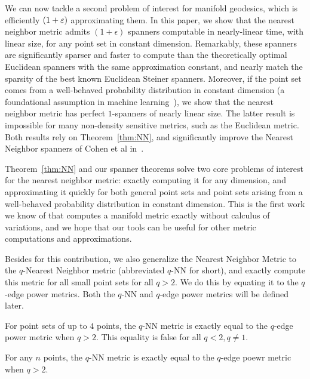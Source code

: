 We can now tackle a second problem of interest for manifold geodesics,
which is efficiently $(1+\varepsilon)$ approximating them. In this paper, we show
that the nearest neighbor metric admits $(1+\epsilon)$ spanners computable
in nearly-linear time, with linear size, for any point set in constant
dimension. Remarkably, these spanners are significantly sparser and faster
to compute than the theoretically optimal Euclidean spanners with the same
approximation constant, and nearly match the sparsity of the best known
Euclidean Steiner spanners. Moreover, if the point set comes from a
well-behaved probability distribution in constant dimension (a foundational
assumption in machine learning~\cite{}), we show that the nearest neighbor
metric has perfect $1$-spanners of nearly linear size. The latter result is
impossible for many non-density sensitive metrics, such as the Euclidean
metric. Both results rely on Theorem~\ref{thm:NN}, and significantly
improve the Nearest Neighbor spanners of Cohen et al in~\cite{}.

Theorem~\ref{thm:NN} and our spanner theorems solve two core problems of
interest for the nearest neighbor metric: exactly computing it for any
dimension, and approximating it quickly for both general point sets and
point sets arising from a well-behaved probability distribution in constant
dimension. This is the first work we know of that computes a manifold
metric exactly without calculus of variations, and we hope that our tools
can be useful for other metric computations and approximations. 

Besides for this contribution, we also generalize the Nearest Neighbor
Metric to the $q$-Nearest Neighbor metric (abbreviated $q$-NN for short),
and exactly compute this metric for all small point sets for all $q>2$. We
do this by equating it to the $q$-edge power metrics. Both the $q$-NN and
$q$-edge power metrics will be defined later.
\begin{theorem} \label{thm:qNN}
For point sets of up to $4$ points, the $q$-NN metric is exactly equal to
the $q$-edge power metric when $q>2$. This equality is false for all $q <
2, q\not=1$.
\end{theorem}
\begin{conjecture}\label{conj:qNN}
For any $n$ points, the $q$-NN metric is exactly equal to the $q$-edge
poewr metric when $q>2$.
\end{conjecture}

